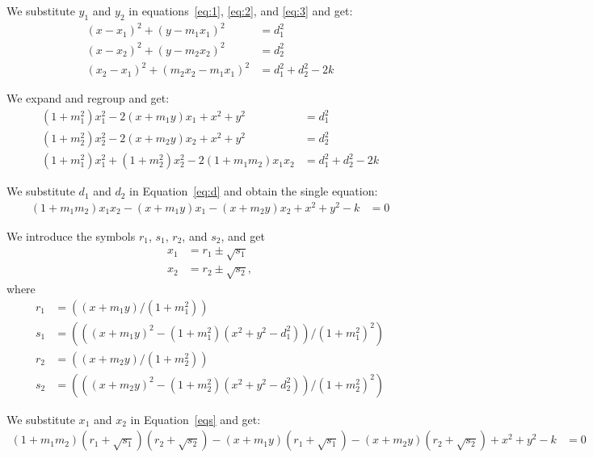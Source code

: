 \noindent
We substitute $y_1$ and $y_2$ in equations~\ref{eq:1}, \ref{eq:2}, and \ref{eq:3} and get:
\begin{align}
  (x - x_1)^2 + (y - m_1 x_1)^2 & = d_1^2\\
  (x - x_2)^2 + (y - m_2 x_2)^2 & = d_2^2\\
  (x_2 - x_1)^2 + (m_2 x_2 - m_1 x_1)^2 & = d_1^2 + d_2^2 - 2 k
\end{align}

\noindent
We expand and regroup and get:
\begin{align}
  (1 + m_1^2) x_1^2 - 2 (x + m_1 y) x_1  + x^2 + y^2  &= d_1^2\label{eq:d1}\\
  (1 + m_2^2) x_2^2 - 2 (x + m_2 y) x_2  + x^2 + y^2  &= d_2^2\label{eq:d2}\\
  (1 + m_1^2) x_1^2 + (1 + m_2^2) x_2^2 - 2 (1 + m_1 m_2) x_1 x_2 &= d_1^2 + d_2^2 - 2 k\label{eq:d}
\end{align}

\noindent
We substitute $d_1$ and $d_2$ in Equation~\ref{eq:d} and obtain the single equation:
\begin{align}
  (1 + m_1 m_2) x_1 x_2 - (x + m_1 y) x_1 - (x + m_2 y) x_2 + x^2 + y^2 - k &= 0\label{eqs}
\end{align}

\noindent
We introduce the symbols $r_1$, $s_1$, $r_2$, and $s_2$, and get
\begin{align*}
  x_1 &= r_1 \pm \sqrt{s_1}\\
  x_2 &= r_2 \pm \sqrt{s_2},
\end{align*}
where
\begin{align*}
  r_1 &= ((x + m_1 y) / (1 + m_1^2))\\
  s_1 &= (((x + m_1 y)^2 - (1 + m_1^2) (x^2 + y^2 - d_1^2)) / (1 + m_1^2)^2)\\
  r_2 &= ((x + m_2 y) / (1 + m_2^2))\\
  s_2 &= (((x + m_2 y)^2 - (1 + m_2^2) (x^2 + y^2 - d_2^2)) / (1 + m_2^2)^2)
\end{align*}

\noindent
We substitute $x_1$ and $x_2$ in Equation~\ref{eqs} and get:
\begin{align*}
(1 + m_1 m_2) (r_1 + \sqrt{s_1}) (r_2 + \sqrt{s_2}) - (x + m_1 y) (r_1 + \sqrt{s_1}) - (x + m_2 y) (r_2 + \sqrt{s_2}) + x^2 + y^2 - k &= 0
\end{align*}

